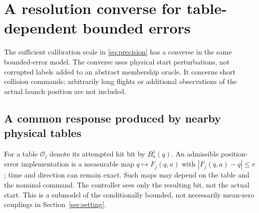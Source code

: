 \section{A resolution converse for table-dependent bounded errors}
\label{sec:calibration-floor}
The sufficient calibration scale in \eqref{eq:precision} has a converse
in the same bounded-error model. The converse uses physical start
perturbations, not corrupted labels added to an abstract membership
oracle. It concerns short collision commands; arbitrarily long flights
or additional observations of the actual launch position are not included.

\subsection{A common response produced by nearby physical tables}
For a table $\mathcal O_j$ denote its attempted hit bit by $B^j_a(q)$.
An admissible position-error implementation is a measurable map
$q\mapsto F_j(q,a)$ with $|F_j(q,a)-q|\le r$; time and direction
can remain exact. Such maps may depend on the table and the nominal
command. The controller sees only the resulting bit, not the actual
start. This is a submodel of the conditionally bounded, not necessarily
mean-zero couplings in Section~\ref{sec:setting}.

